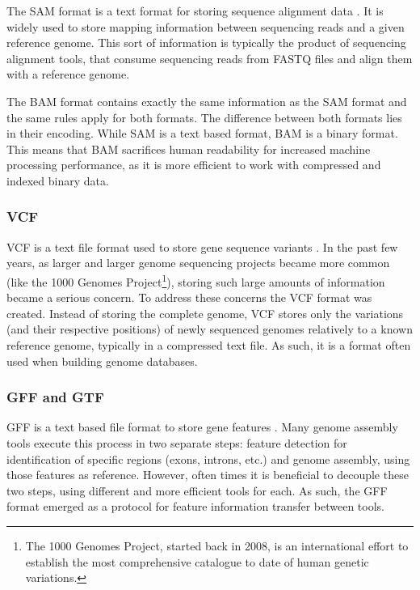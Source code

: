 The SAM format is a text format for storing sequence alignment data
\cite{genome:sam}. It is widely used to store mapping information between
sequencing reads and a given reference genome. This sort of information is
typically the product of sequencing alignment tools, that consume sequencing
reads from FASTQ files and align them with a reference genome.

The BAM format contains exactly the same information as the SAM format and the
same rules apply for both formats. The difference between both formats lies in
their encoding. While SAM is a text based format, BAM is a binary format. This
means that BAM sacrifices human readability for increased machine processing
performance, as it is more efficient to work with compressed and indexed binary
data.

\subsubsection*{VCF}

VCF is a text file format used to store gene sequence variants \cite{smith13}.
In the past few years, as larger and larger genome sequencing projects became
more common (like the 1000 Genomes Project\footnote{The 1000 Genomes Project,
started back in 2008, is an international effort to establish the most
comprehensive catalogue to date of human genetic variations.}), storing such
large amounts of information became a serious concern. To address these concerns
the VCF format was created. Instead of storing the complete genome, VCF stores
only the variations (and their respective positions) of newly sequenced genomes
relatively to a known reference genome, typically in a compressed text file. As
such, it is a format often used when building genome databases.

\subsubsection*{GFF and GTF}

GFF is a text based file format to store gene features \cite{sanger11}. Many
genome assembly tools execute this process in two separate steps: feature
detection for identification of specific regions (exons, introns, etc.) and
genome assembly, using those features as reference. However, often times it is
beneficial to decouple these two steps, using different and more efficient tools
for each. As such, the GFF format emerged as a protocol for feature information
transfer between tools.

